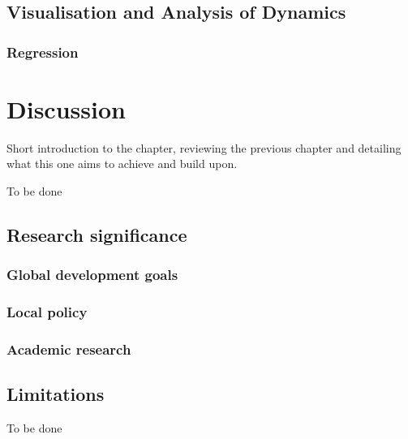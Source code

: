 \documentclass[
  12pt,
  oneside]{book}
\begin{document}
\hypertarget{visualisation-and-analysis-of-dynamics}{%
\section{Visualisation and Analysis of Dynamics}\label{visualisation-and-analysis-of-dynamics}}

\hypertarget{regression}{%
\subsection{Regression}\label{regression}}

\hypertarget{discussion}{%
\chapter{Discussion}\label{discussion}}

Short introduction to the chapter, reviewing the previous chapter and detailing what this one aims to achieve and build upon.

To be done

\hypertarget{research-significance}{%
\section{Research significance}\label{research-significance}}

\hypertarget{global-development-goals}{%
\subsection{Global development goals}\label{global-development-goals}}

\hypertarget{local-policy}{%
\subsection{Local policy}\label{local-policy}}

\hypertarget{academic-research}{%
\subsection{Academic research}\label{academic-research}}

\hypertarget{limitations-1}{%
\section{Limitations}\label{limitations-1}}

To be done
\end{document}
